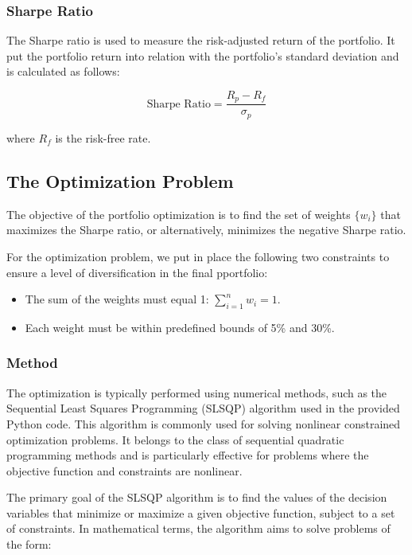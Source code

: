 \documentclass{article}
\begin{document}
\subsubsection*{Sharpe Ratio}

The Sharpe ratio is used to measure the risk-adjusted return of the portfolio. It put the portfolio return into relation with the portfolio's standard deviation and is calculated as follows:

\begin{equation}
\text{Sharpe Ratio} = \frac{R_p - R_f}{\sigma_p}
\end{equation}

where \( R_f \) is the risk-free rate.

\subsection{The Optimization Problem}

The objective of the  portfolio optimization is to find the set of weights \( \{ w_i \} \) that maximizes the Sharpe ratio, or alternatively, minimizes the negative Sharpe ratio.


For the optimization problem, we put in place the following two constraints to ensure a level of diversification in the final pportfolio:

\begin{itemize}
    \item The sum of the weights must equal 1: \( \sum_{i=1}^{n} w_i = 1 \).
    \item Each weight must be within predefined bounds of 5\% and 30\%.
\end{itemize}

\subsubsection*{Method}

The optimization is typically performed using numerical methods, such as the Sequential Least Squares Programming (SLSQP) algorithm used in the provided Python code. This algorithm is commonly used for solving nonlinear constrained optimization problems. It belongs to the class of sequential quadratic programming methods and is particularly effective for problems where the objective function and constraints are nonlinear.

The primary goal of the SLSQP algorithm is to find the values of the decision variables that minimize or maximize a given objective function, subject to a set of constraints. In mathematical terms, the algorithm aims to solve problems of the form:
\end{document}
